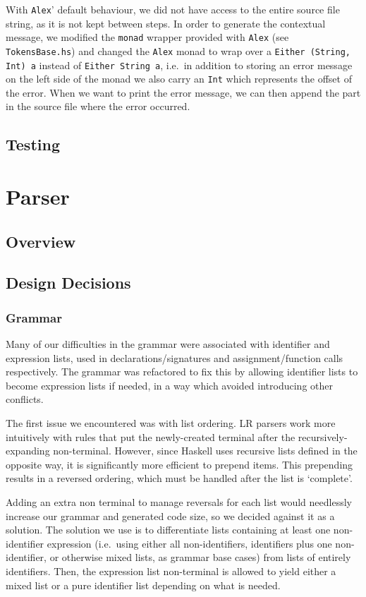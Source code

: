 \documentclass[11pt]{article}
\begin{document}
With \texttt{Alex}' default behaviour, we did not have access to the entire
source file string, as it is not kept between steps. In order to
generate the contextual message, we modified the \texttt{monad} wrapper
provided with \texttt{Alex} (see \texttt{TokensBase.hs}) and changed the \texttt{Alex}
monad to wrap over a \texttt{Either (String, Int) a} instead of
\texttt{Either String a}, i.e.\ in addition to storing an error message on
the left side of the monad we also carry an \texttt{Int} which represents
the offset of the error. When we want to print the error
message, we can then append the part in the source file where
the error occurred.

\subsection{Testing}
\section{Parser}
\subsection{Overview}
\subsection{Design Decisions}
\subsubsection{Grammar}
Many of our difficulties in the grammar were associated with identifier and
expression lists, used in declarations/signatures and assignment/function
calls respectively. The grammar was refactored to fix this by allowing
identifier lists to become expression lists if needed, in a way which
avoided introducing other conflicts.

The first issue we encountered was with list ordering. LR parsers
work more intuitively with rules that put the newly-created terminal
after the recursively-expanding non-terminal. However, since Haskell
uses recursive lists defined in the opposite way, it is significantly
more efficient to prepend items. This prepending results in a reversed
ordering, which must be handled after the list is `complete'.

Adding an extra non terminal to manage reversals for each list would
needlessly increase our grammar and generated code size, so we decided
against it as a solution. The solution we use is to differentiate
lists containing at least one non-identifier expression (i.e.\ using either
all non-identifiers, identifiers plus one non-identifier, or otherwise mixed
lists, as grammar base cases) from lists of entirely identifiers. Then,
the expression list non-terminal is allowed to yield either a mixed list
or a pure identifier list depending on what is needed.
\end{document}
